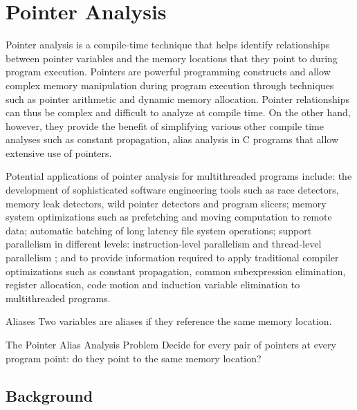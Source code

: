 \newpage




\section{Pointer Analysis}

Pointer analysis is a compile-time technique that helps identify relationships between pointer variables and the memory locations that
they point to during program execution. Pointers are powerful programming constructs and allow complex memory manipulation during program
execution through techniques such as pointer arithmetic and dynamic memory allocation. Pointer relationships can thus be complex and difficult
to analyze at compile time. On the other hand, however, they provide the benefit of simplifying various other compile time analyses such as
constant propagation, alias analysis in C programs that allow extensive use of pointers.\cite{Pointsto7:online}



Potential applications of pointer analysis for multithreaded programs include:
the development of sophisticated software engineering tools such as race detectors, memory leak detectors, wild pointer detectors and program slicers;
memory system optimizations such as prefetching
and moving computation to remote data; automatic batching of long latency
file system operations; support parallelism in different levels: instruction-level parallelism and thread-level parallelism ;
and to provide information required to apply traditional
compiler optimizations such as constant propagation, common subexpression
elimination, register allocation, code motion and induction variable elimination
to multithreaded programs.\cite{rugina2003pointer}

\begin{definition}{Aliases}
	Two variables are aliases if they reference the same memory location.
\end{definition}


\begin{definition}{The	Pointer	Alias	Analysis	Problem	}
	Decide for every pair of pointers at every program point: do they point to the same memory location?
\end{definition}

\subsection{Background}

